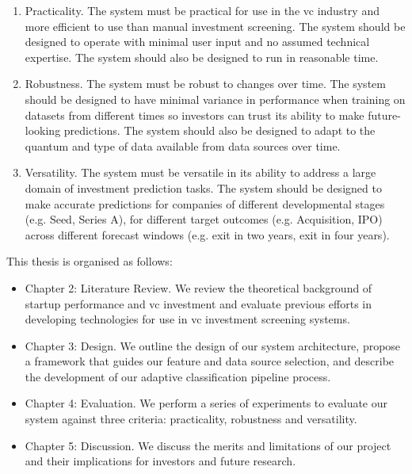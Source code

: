 \documentclass[../thesis/thesis.tex]{subfiles}
\begin{document}
\begin{enumerate}

\item Practicality. The system must be practical for use in the \gls{vc} industry and more efficient to use than manual investment screening. The system should be designed to operate with minimal user input and no assumed technical expertise. The system should also be designed to run in reasonable time.

\item Robustness. The system must be robust to changes over time. The system should be designed to have minimal variance in performance when training on datasets from different times so investors can trust its ability to make future-looking predictions. The system should also be designed to adapt to the quantum and type of data available from data sources over time.

\item Versatility. The system must be versatile in its ability to address a large domain of investment prediction tasks. The system should be designed to make accurate predictions for companies of different developmental stages (e.g. Seed, Series A), for different target outcomes (e.g. Acquisition, IPO) across different forecast windows (e.g. exit in two years, exit in four years).

\end{enumerate}

This thesis is organised as follows:

\begin{itemize}

\item Chapter 2: Literature Review. We review the theoretical background of startup performance and \gls{vc} investment and evaluate previous efforts in developing technologies for use in \gls{vc} investment screening systems.

\item Chapter 3: Design. We outline the design of our system architecture, propose a framework that guides our feature and data source selection, and describe the development of our adaptive classification pipeline process.

\item Chapter 4: Evaluation. We perform a series of experiments to evaluate our system against three criteria: practicality, robustness and versatility.

\item Chapter 5: Discussion. We discuss the merits and limitations of our project and their implications for investors and future research.

\end{itemize}

\end{document}
